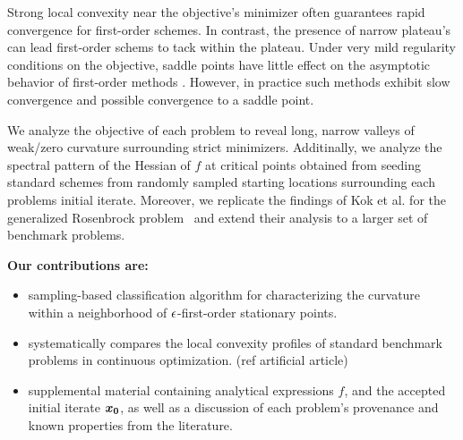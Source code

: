 \documentclass[10pt]{article}
\begin{document}
    \medskip 
    
    Strong local convexity near the objective's minimizer often guarantees rapid convergence 
    for first-order schemes. In contrast, the presence of narrow plateau's can lead first-order schems to tack within the plateau.
    Under very mild regularity conditions on the objective, saddle points have little effect on the asymptotic behavior of
    first-order methods \cite{lee2017first}. However, in practice such methods exhibit slow 
    convergence and possible convergence to a saddle point.
    
    \bigskip

    We analyze the objective of each problem to reveal long, 
    narrow valleys of weak/zero curvature surrounding strict minimizers.
    Additinally, we analyze the spectral pattern of the Hessian of $f$ at
    critical points obtained from seeding standard schemes from randomly
    sampled starting locations surrounding each problems initial iterate.
    Moreover, we replicate the findings of Kok et al. for the generalized
    Rosenbrock problem~\cite{Kok2009} and extend their analysis to 
    a larger set of benchmark problems.

    \medskip 

    \textbf{Our contributions are:}
    \begin{itemize}
        \item sampling-based classification algorithm for characterizing the curvature
        within a neighborhood of $\epsilon$-first-order stationary points. 
        \item systematically compares the local convexity profiles of standard
        benchmark problems in continuous optimization. (ref artificial article)
        \item supplemental material containing analytical expressions $f$, and the
        accepted initial iterate $\bm{x_0}$, as well as a discussion of
        each problem's provenance and known properties from the literature. 
    \end{itemize}
\end{document}
